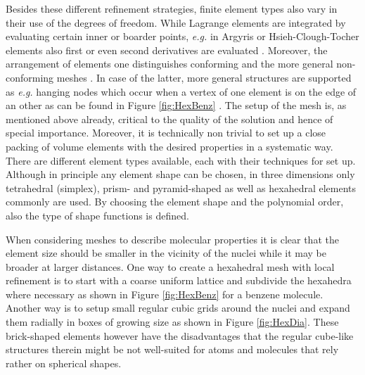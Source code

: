 Besides these different refinement strategies, finite element types also vary in their use of the degrees of freedom.
While Lagrange elements are integrated by evaluating certain inner or boarder points, \textit{e.g.} in Argyris or Hsieh-Clough-Tocher elements also first or even second derivatives are evaluated \cite{femPraxis,femCiarlet}.
Moreover, the arrangement of elements one distinguishes conforming and the more general non-conforming meshes \cite{nonconfFEM}. In case of the latter, more general structures are supported as \textit{e.g.} hanging nodes which occur when a vertex of one element is on the edge of an other as can be found in Figure \ref{fig:HexBenz} \cite{femCiarlet}.
The setup of the mesh is, as mentioned above already, critical to the quality of the solution and hence of special importance.
Moreover, it is technically non trivial to set up a close packing of volume elements with the desired properties in a systematic way.
There are different element types available, each with their techniques for set up.
Although in principle any element shape can be chosen, in three dimensions only tetrahedral (simplex), prism- and pyramid-shaped as well as hexahedral elements commonly are used.
By choosing the element shape and the polynomial order, also the type of shape functions is defined.

When considering meshes to describe molecular properties it is clear that the element size should be smaller in the vicinity of the nuclei while it may be broader at larger distances.
One way to create a hexahedral mesh with local refinement is to start with a coarse uniform lattice and subdivide the hexahedra where necessary as shown in Figure \ref{fig:HexBenz} for a benzene molecule.
Another way is to setup small regular cubic grids around the nuclei and expand them radially in boxes of growing size as shown in Figure \ref{fig:HexDia}.
These brick-shaped elements however have the disadvantages that the regular cube-like structures therein might be not well-suited for atoms and molecules that rely rather on spherical shapes.

